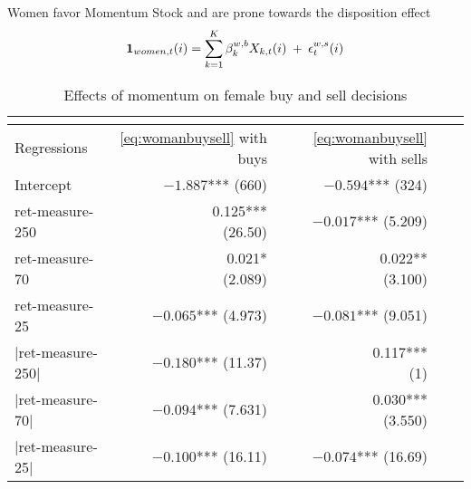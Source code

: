 \documentclass{beamer}
\begin{document}
\begin{frame}{Women favor Momentum Stock and are prone towards the disposition effect}
\begin{equation}
    \label{eq:womanbuysell} 
    \tiny
    {\bf 1}_{women, t}(i) = \sum_{k=1}^K\beta_k^{w,b} X_{k,t}(i)\ +\ \epsilon_t^{w,s}(i)
\end{equation}
\begin{table}[htbp]
    \centering
    \caption{Effects of momentum on female buy and sell decisions }
    \label{tab:regression1}
    \tiny
\begin{tabular}{ lrrrr } 
 \multicolumn{1}{c}{} \\
 \toprule
  Regressions & \eqref{eq:womanbuysell} with buys & \eqref{eq:womanbuysell} with sells  \\ 
   \midrule 
 Intercept   &\shortstack{$-1.887$*** \\ (660)} & \shortstack{$-0.594$*** \\ (324)}  \\ 
  
 ret-measure-250 & \shortstack{0.125*** \\ (26.50)} & \shortstack{$-0.017$*** \\ (5.209)} \\ 
 
 ret-measure-70& \shortstack{0.021* \\ (2.089) }& \shortstack{ 0.022**  \\ (3.100)}\\
 
 ret-measure-25 & \shortstack{$-0.065$*** \\ (4.973)} & \shortstack{$-0.081$*** \\ (9.051)}  \\
 
 $|$ret-measure-250$|$ & \shortstack{$-0.180$*** \\ (11.37)} &  \shortstack{0.117*** \\ (1)}  \\ 
 
 $|$ret-measure-70$|$ & \shortstack{$-0.094$*** \\ (7.631)}  &  \shortstack{0.030***  \\ (3.550)} \\ 
 
 $|$ret-measure-25$|$ & \shortstack{$-0.100$*** \\ (16.11)}  &  \shortstack{$-0.074$***  \\ (16.69)} \\ 
 \bottomrule
\end{tabular}

\end{table}

\end{frame}
\end{document}
